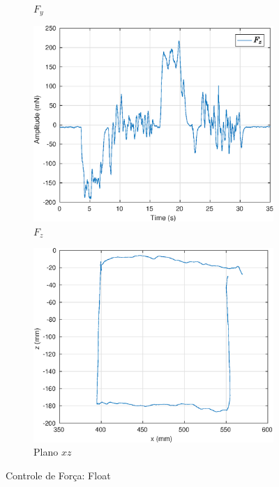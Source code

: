 \begin{figure}[H]
\begin{subfigure}{.5\textwidth}
  \caption{$F_y$}
  \label{fig:sub2}	
\end{subfigure}
\begin{subfigure}{.5\textwidth}
  \centering
  \includegraphics[width=\linewidth]{./img/float2/Fz.eps}
  \caption{$F_z$}
  \label{fig:sub1}
\end{subfigure}%
\begin{subfigure}{.5\textwidth}
  \centering
  \includegraphics[width=\linewidth]{./img/float2/xz.eps}
  \caption{Plano $xz$}
  \label{fig:sub2}
\end{subfigure}
\caption{Controle de Força: Float}
\label{fig:test}
\end{figure}

